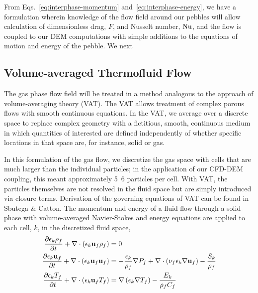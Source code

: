 From Eqs.~\ref{eq:interphase-momentum} and~\ref{eq:interphase-energy}, we have a formulation wherein knowledge of the flow field around our pebbles will allow calculation of dimensionless drag, $F$, and Nusselt number, $\Nu$, and the flow is coupled to our DEM computations with simple additions to the equations of motion and energy of the pebble. We next 




\subsection{Volume-averaged Thermofluid Flow}

The gas phase flow field will be treated in a method analogous to the approach of volume-averaging theory (VAT).\cite{Sbutega2013,whitaker1999method,Tsuji1992} The VAT allows treatment of complex porous flows with smooth continuous equations. In the VAT, we average over a discrete space to replace complex geometry with a fictitious, smooth, continuous medium in which quantities of interested are defined independently of whether specific locations in that space are, for instance, solid or gas.

In this formulation of the gas flow, we discretize the gas space with cells that are much larger than the individual particles; in the application of our CFD-DEM coupling, this meant approximately 5~6 particles per cell. With VAT, the particles themselves are not resolved in the fluid space but are simply introduced via closure terms.\cite{Sbutega2013,Horvat2006} Derivation of the governing equations of VAT can be found in Sbutega \& Catton\cite{Sbutega2013}. The momentum and energy of a fluid flow through a solid phase with volume-averaged Navier-Stokes and energy equations are applied to each cell, $k$, in the discretized fluid space,
\begin{subequations}\label{eq:cfd-equations}
\begin{align}
\pder[\epsilon_k \rho_f]{t} + \nabla\cdot(\epsilon_k \vec{u}_f \rho_f) &= 0\\
\pder[\epsilon_k \vec{u}_f]{t} + \nabla\cdot(\epsilon_k \vec{u}_f \vec{u}_f) &= -\frac{\epsilon_k}{\rho_f}\nabla P_f + \nabla\cdot\left(\nu_f\epsilon_k\nabla \vec{u}_f\right) - \frac{S_k}{\rho_f}\\
\pder[\epsilon_k T_f]{t} + \nabla\cdot(\epsilon_k \vec{u}_f T_f) &= \nabla\left(\epsilon_k\nabla T_f\right)-\frac{E_k}{\rho_fC_f}
\end{align}
\end{subequations}

